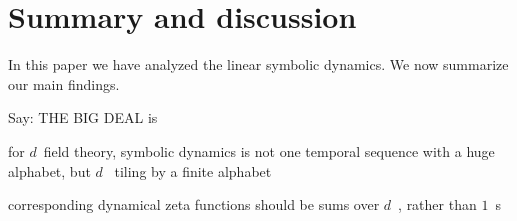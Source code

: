 
\section{Summary and discussion}
\label{s:summary}

In this paper we have analyzed the {\catlatt}  
linear symbolic dynamics. We now summarize our main findings.

     {
Say: THE BIG DEAL is

for $d$\dmn\ field theory, symbolic dynamics is not one temporal sequence
with a huge alphabet, but $d$\dmn\ {\spt} tiling by a finite alphabet

corresponding dynamical zeta functions
should be sums over $d$\dmn\ {\twots}, rather than $1$\dmn\ \po s
    }

